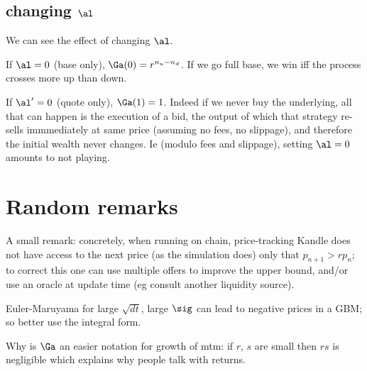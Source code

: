 \documentclass[oneside,twocolumn,12pt]{article}
\begin{document}
\subsection{changing $\al$}
We can see the effect of changing $\al$.

If $\al=0$ (base only), $\Ga(0) = r^{n_u-n_d}$. If we go full base,
we win iff the process crosses more up than down.

If $\al'=0$ (quote only), $\Ga(1) = 1$. Indeed if we never buy the underlying,
all that can happen is the execution of a bid, 
the output of which that strategy re-sells immmediately at same price (assuming no fees, no slippage),
and therefore the initial wealth never changes. Ie (modulo fees and slippage), setting $\al=0$ amounts to not playing.


\section{Random remarks}

A small remark: concretely, when running on chain, price-tracking Kandle does not have access to the next price (as the simulation does)
only that $p_{n+1}>r p_n$;
to correct this one can use multiple offers to improve the upper bound,
and/or use an oracle at update time (eg consult another liquidity source).

Euler-Maruyama for large $\sqrt{dt}$, large $\sig$ can lead to negative prices in a GBM;
so better use the integral form. 


Why is $\Ga$ an easier notation for growth of mtm:
if $r$, $s$ are small then $rs$ is negligible which explains why people talk with returns.



\end{document}
